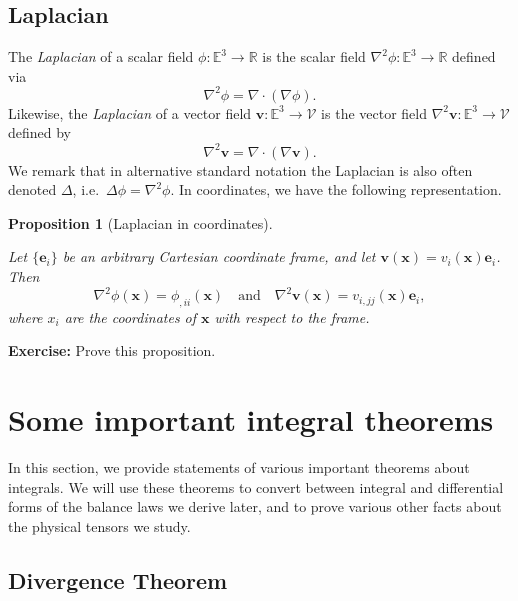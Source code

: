 \documentclass[
  letterpaper,
  DIV=11,
  numbers=noendperiod]{scrreprt}
\theoremstyle{plain}
\newtheorem{proposition}{Proposition}[chapter]
\theoremstyle{remark}
\begin{document}
\subsection{Laplacian}\label{laplacian}

The \emph{Laplacian} of a scalar field
\(\phi:{\mathbb{E}}^3\to{\mathbb{R}}\) is the scalar field
\(\nabla^2\phi:{\mathbb{E}}^3\to{\mathbb{R}}\) defined via
\[\nabla^2\phi = \nabla\cdot(\nabla \phi).\] Likewise, the
\emph{Laplacian} of a vector field
\({\boldsymbol{v}}:{\mathbb{E}}^3\to{\mathcal{V}}\) is the vector field
\(\nabla^2{\boldsymbol{v}}:{\mathbb{E}}^3\to{\mathcal{V}}\) defined by
\[\nabla^2{\boldsymbol{v}}= \nabla\cdot(\nabla {\boldsymbol{v}}).\] We
remark that in alternative standard notation the Laplacian is also often
denoted \(\Delta\), i.e.~\(\Delta\phi=\nabla^2\phi\). In coordinates, we
have the following representation.

\begin{proposition}[Laplacian in
coordinates]\protect\hypertarget{prp-Laplacianincoords}{}\label{prp-Laplacianincoords}

Let \(\{{\boldsymbol{e}}_i\}\) be an arbitrary Cartesian coordinate
frame, and let
\({\boldsymbol{v}}({\boldsymbol{x}}) = v_i({\boldsymbol{x}}){\boldsymbol{e}}_i\).
Then
\[\nabla^2\phi({\boldsymbol{x}}) = \phi_{,ii}({\boldsymbol{x}}) \quad\text{and}\quad\nabla^2{\boldsymbol{v}}({\boldsymbol{x}}) = v_{i,jj}({\boldsymbol{x}}){\boldsymbol{e}}_i,\]
where \(x_i\) are the coordinates of \({\boldsymbol{x}}\) with respect
to the frame.

\end{proposition}

\textbf{Exercise:} Prove this proposition.

\section{Some important integral
theorems}\label{some-important-integral-theorems}

In this section, we provide statements of various important theorems
about integrals. We will use these theorems to convert between integral
and differential forms of the balance laws we derive later, and to prove
various other facts about the physical tensors we study.

\subsection{Divergence Theorem}\label{divergence-theorem}
\end{document}
